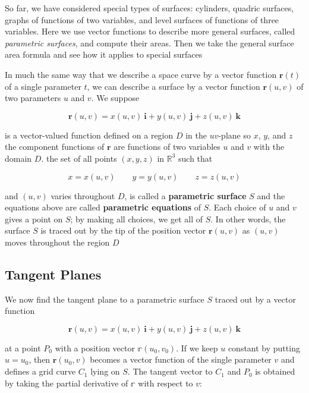 \documentclass{article}
\begin{document}
So far, we have considered special types of surfaces: cylinders, quadric surfaces, graphs of functions of two variables, and level surfaces of functions of three variables. Here we use vector functions to describe more general surfaces, called \textit{parametric surfaces}, and compute their areas. Then we take the general surface area formula and see how it applies to special surfaces

In much the same way that we describe a space curve by a vector function $\mathbf{r}(t)$ of a single parameter $t$, we can describe a surface by a vector function $\mathbf{r}(u,v)$ of two parameters $u$ and $v$. We suppose

\begin{equation*}
    \mathbf{r}(u,v) = x(u,v) \ \mathbf{i} + y(u,v) \ \mathbf{j} + z(u,v) \ \mathbf{k}
\end{equation*}

is a vector-valued function defined on a region $D$ in the $uv$-plane so $x$, $y$, and $z$ the component functions of $\mathbf{r}$ are functions of two variables $u$ and $v$ with the domain $D$. the set of all points $(x,y,z)$ in $\mathbb{R}^3$ such that 

\begin{equation*}
    x = x(u,v) \qquad y = y(u,v) \qquad z = z(u,v)
\end{equation*}

and $(u,v)$ varies throughout $D$, is called a \textbf{parametric surface} $S$ and the equations above are called \textbf{parametric equations} of $S$. Each choice of $u$ and $v$ gives a point on $S$; by making all choices, we get all of $S$. In other words, the surface $S$ is traced out by the tip of the position vector $\mathbf{r}(u,v)$ as $(u,v)$ moves throughout the region $D$

\subsection{Tangent Planes}

We now find the tangent plane to a parametric surface $S$ traced out by a vector function 

\begin{equation*}
    \mathbf{r}(u,v) = x(u,v) \ \mathbf{i} + y(u,v) \ \mathbf{j} + z(u,v) \ \mathbf{k}
\end{equation*}

at a point $P_0$ with a position vector $\mathbb{r}(u_0, v_0)$. If we keep $u$ constant by putting $u = u_0$, then $\mathbf{r}(u_0,v)$ becomes a vector function of the single parameter $v$ and defines a grid curve $C_1$ lying on $S$. The tangent vector to $C_1$ and $P_0$ is obtained by taking the partial derivative of $\mathbb{r}$ with respect to $v$: 
\end{document}
